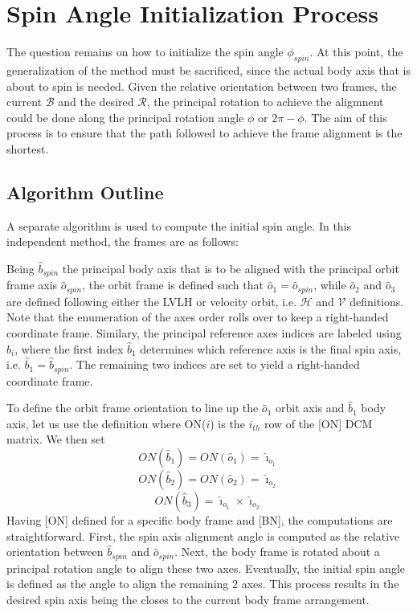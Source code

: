 \documentclass[]{AVSSimReportMemo}
\begin{document}
\section{Spin Angle Initialization Process}
The question remains on how to initialize the spin angle $\phi_{spin}$. At this point, the generalization of the method must be sacrificed, since the actual body axis that is about to spin is needed. Given the relative orientation between two frames, the current $\mathcal{B}$ and the desired $\mathcal{R}$, the principal rotation to achieve the aligmnent could be done along the principal rotation angle $\phi$ or $2\pi - \phi$. The aim of this process is to ensure that the path followed to achieve the frame alignment is the shortest.
\subsection{Algorithm Outline}
A separate algorithm is used to compute the initial spin angle. In this independent method, the frames are as follows:\par
Being $\hat{b}_{spin}$ the principal body axis that is to be aligned with the principal orbit frame axis $\hat{o}_{spin}$, the orbit frame is defined such that $\hat{o}_{1} = \hat{o}_{spin}$, while $\hat{o}_{2}$ and $\hat{o}_{3}$ are defined following either the LVLH or velocity orbit, i.e. $\mathcal{H}$ and $\mathcal{V}$ definitions. Note that the enumeration of the axes order rolls over to keep a right-handed coordinate frame. Similary, the principal reference axes indices are labeled using $\hat b_{i}$, where the first index $\hat b_{1}$ determines which reference axis is the final spin axis, i.e. $\hat b_{1} =\hat b_{spin}$. The remaining two indices are set to yield a right-handed coordinate frame.\par
To define the orbit frame orientation to line up the $\hat o_{1}$ orbit axis and $\hat b_{1}$ body axis, let us use the definition where ON($i$) is the $i_{th}$ row of the [ON] DCM matrix. We then set
\begin{equation}
	\label{eq:dbeta}
	ON(\hat b_{1}) = ON(\hat o_{1}) = \bm\hat\imath_{o_{1}}
\end{equation}
\begin{equation}
	\label{eq:dbeta}
	ON(\hat b_{2}) = ON(\hat o_{2}) = \bm\hat\imath_{o_{2}}
\end{equation}
\begin{equation}
	\label{eq:dbeta}
	ON(\hat b_{3}) = \bm\hat\imath_{o_{1}} \times \bm\hat\imath_{o_{2}}
\end{equation}
Having [ON] defined for a specific body frame and [BN], the computations are straightforward. First, the spin axis alignment angle is computed as the relative orientation between $\hat b_{spin}$ and $\hat o_{spin}$. Next, the body frame is rotated about a principal rotation angle to align these two axes. Eventually, the initial spin angle is defined as the angle to align the remaining 2 axes. This process results in the desired spin axis being the closes to the current body frame arrangement.



\end{document}
